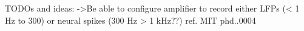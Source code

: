TODOs and ideas:
    ->Be able to configure amplifier to record either LFPs (< 1 Hz to 300) or neural spikes (300 Hz > 1 kHz??)
    ref. MIT phd..0004
    
    